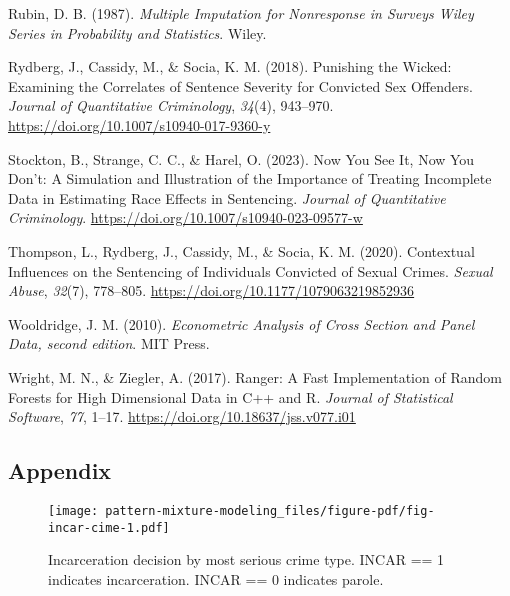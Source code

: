 \documentclass[
  letterpaper,
  DIV=11,
  numbers=noendperiod]{scrartcl}
\newlength{\cslhangindent}
\newlength{\cslentryspacingunit} %
\newenvironment{CSLReferences}[2] %
 {%
  \setlength{\parindent}{0pt}
  \ifodd #1
  \let\oldpar\par
  \def\par{\hangindent=\cslhangindent\oldpar}
  \fi
  \setlength{\parskip}{#2\cslentryspacingunit}
 }%
 {}
\begin{document}
\begin{CSLReferences}{1}{0}
\leavevmode{}%
Rubin, D. B. (1987). \emph{{Multiple Imputation for Nonresponse in
Surveys {\textbar} Wiley Series in Probability and Statistics}}.
{Wiley}.

\leavevmode{}%
Rydberg, J., Cassidy, M., \& Socia, K. M. (2018). Punishing the
{Wicked}: {Examining} the {Correlates} of {Sentence Severity} for
{Convicted Sex Offenders}. \emph{Journal of Quantitative Criminology},
\emph{34}(4), 943--970. \url{https://doi.org/10.1007/s10940-017-9360-y}

\leavevmode{}%
Stockton, B., Strange, C. C., \& Harel, O. (2023). Now You See It, Now
You Don{'}t: A Simulation and Illustration of the Importance of Treating
Incomplete Data in Estimating Race Effects in Sentencing. \emph{Journal
of Quantitative Criminology}.
\url{https://doi.org/10.1007/s10940-023-09577-w}

\leavevmode{}%
Thompson, L., Rydberg, J., Cassidy, M., \& Socia, K. M. (2020).
Contextual {Influences} on the {Sentencing} of {Individuals Convicted}
of {Sexual Crimes}. \emph{Sexual Abuse}, \emph{32}(7), 778--805.
\url{https://doi.org/10.1177/1079063219852936}

\leavevmode{}%
Wooldridge, J. M. (2010). \emph{Econometric {Analysis} of {Cross
Section} and {Panel Data}, second edition}. {MIT Press}.

\leavevmode{}%
Wright, M. N., \& Ziegler, A. (2017). Ranger: {A Fast Implementation} of
{Random Forests} for {High Dimensional Data} in {C}++ and {R}.
\emph{Journal of Statistical Software}, \emph{77}, 1--17.
\url{https://doi.org/10.18637/jss.v077.i01}

\end{CSLReferences}

\newpage

\hypertarget{appendix}{%
\subsection*{Appendix}\label{appendix}}

\begin{figure}

{\centering \texttt{[image: pattern-mixture-modeling\_files/figure-pdf/fig-incar-cime-1.pdf]}

}

\caption{\label{fig-incar-cime}Incarceration decision by most serious
crime type. INCAR == 1 indicates incarceration. INCAR == 0 indicates
parole.}

\end{figure}
\end{document}
